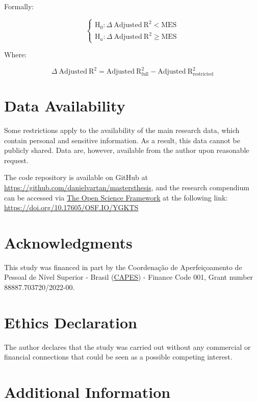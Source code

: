 \documentclass[
12pt,
openright,
oneside,
a4paper,
chapter=TITLE,
section=TITLE,
french,
spanish,
brazil,
english
]{abntex2}
\begin{document}
Formally:

\[
\begin{cases}
\text{H}_{0}: \Delta \ \text{Adjusted} \ \text{R}^{2} < \text{MES} \\
\text{H}_{a}: \Delta \ \text{Adjusted} \ \text{R}^{2} \geq \text{MES}
\end{cases}
\]

\medskip

Where:

\[
\Delta \ \text{Adjusted} \ \text{R}^{2} = \text{Adjusted} \ \text{R}^{2}_{\text{full}} - \text{Adjusted} \ \text{R}^{2}_{\text{restricted}}
\]

\medskip

\section{Data Availability}\label{data-availability}

Some restrictions apply to the availability of the main research data,
which contain personal and sensitive information. As a result, this data
cannot be publicly shared. Data are, however, available from the author
upon reasonable request.

The code repository is available on GitHub at
\url{https://github.com/danielvartan/mastersthesis}, and the research
compendium can be accessed via \href{https://osf.io/}{The Open Science
Framework} at the following link:
\url{https://doi.org/10.17605/OSF.IO/YGKTS}

\section{Acknowledgments}\label{acknowledgments}

This study was financed in part by the Coordenação de Aperfeiçoamento de
Pessoal de Nível Superior - Brasil
(\href{https://www.gov.br/capes/}{CAPES}) - Finance Code 001, Grant
number 88887.703720/2022-00.

\section{Ethics Declaration}\label{ethics-declaration}

The author declares that the study was carried out without any
commercial or financial connections that could be seen as a possible
competing interest.

\section{Additional Information}\label{additional-information}
\end{document}
